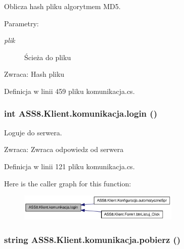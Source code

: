 Oblicza hash pliku algorytmem MD5. 

\begin{Desc}
\item[Parametry:]
\begin{description}
\item[{\em plik}]Ścieża do pliku\end{description}
\end{Desc}
\begin{Desc}
\item[Zwraca:]Hash pliku\end{Desc}


Definicja w linii 459 pliku komunikacja.cs.\hypertarget{a00013_cdc8379f1139bc25fb24a6c9b6ce1cc1}{
\subsubsection[{login}]{\setlength{\rightskip}{0pt plus 5cm}int ASS8.Klient.komunikacja.login ()}}
\label{d7/dd4/a00013_cdc8379f1139bc25fb24a6c9b6ce1cc1}


Loguje do serwera. 

\begin{Desc}
\item[Zwraca:]Zwraca odpowiedz od serwera\end{Desc}


Definicja w linii 121 pliku komunikacja.cs.

Here is the caller graph for this function:\nopagebreak
\begin{figure}[H]
\begin{center}
\leavevmode
\includegraphics[width=218pt]{d7/dd4/a00013_cdc8379f1139bc25fb24a6c9b6ce1cc1_icgraph}
\end{center}
\end{figure}
\hypertarget{a00013_1b3c9442d102dd6e6b4d64cb0c31b660}{
\subsubsection[{pobierz}]{\setlength{\rightskip}{0pt plus 5cm}string ASS8.Klient.komunikacja.pobierz ()}}
\label{d7/dd4/a00013_1b3c9442d102dd6e6b4d64cb0c31b660}


